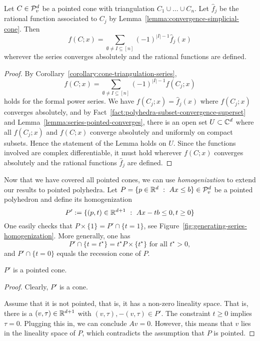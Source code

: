 \begin{lemma}
  \label{lemma:pointed-cone-rational-function}
  Let $C \in \mathcal{P}_v^d$ be a pointed cone
  with triangulation $C_1 \cup \dots \cup C_n$.
  Let $\hat f_j$ be the rational function associated to $C_j$ by Lemma~\ref{lemma:convergence-simplicial-cone}.
  Then
  \[
    f(C;x) = \sum_{\emptyset \neq I \subseteq [n]} (-1)^{|I| - 1} \hat f_j(x)
  \]
  wherever the series converges absolutely and the rational functions are defined.
\end{lemma}
\begin{proof}
  By Corollary~\ref{corollary:cone-triangulation-series},
  \[
    f(C;x) = \sum_{\emptyset \neq I \subseteq [n]} (-1)^{|I| - 1} f(C_j;x)
  \]
  holds for the formal power series.
  We have $f(C_j;x) = \hat f_j(x)$ where $f(C_j;x)$ converges absolutely,
  and by Fact~\ref{fact:polyhedra-subset-convergence-superset}
  and Lemma~\ref{lemma:series-pointed-converges},
  there is an open set $U \subset \mathbb{C}^d$ where all $f(C_j;x)$ and $f(C;x)$
  converge absolutely and uniformly on compact subsets.
  Hence the statement of the Lemma holds on $U$.
  Since the functions involved are complex differentiable,
  it must hold wherever $f(C;x)$ converges absolutely and the rational functions $\hat f_j$ are defined.
\end{proof}

Now that we have covered all pointed cones,
we can use \emph{homogenization} to extend our results to pointed polyhedra.
Let $P = \{ p \in \mathbb{R}^d ~:~ Ax \leq b \} \in \mathcal{P}_v^d$ be a pointed polyhedron and define its homogenization
\[
  P' := \{ (p,t) \in \mathbb{R}^{d+1} ~:~ Ax - tb \leq 0, t \geq 0 \}
\]
One easily checks that $P \times \{ 1 \} = P' \cap \{ t = 1\}$, see Figure~\ref{fig:generating-series-homogenization}.
More generally, one has
\[
  P' \cap \{ t = t^\star \} = t^\star P \times \{ t^\star \} \text{ for all } t^\star > 0,
\]
and $P' \cap \{ t = 0 \}$ equals the recession cone of $P$.

\begin{lemma}
  $P'$ is a pointed cone.
\end{lemma}
\begin{proof}
  Clearly, $P'$ is a cone.

  Assume that it is not pointed, that is, it has a non-zero lineality space.
  That is, there is a $(v,\tau) \in \mathbb{R}^{d + 1}$ with $(v,\tau),-(v,\tau) \in P'$.
  The constraint $t \geq 0$ implies $\tau = 0$.
  Plugging this in, we can conclude $Av = 0$.
  However, this means that $v$ lies in the lineality space of $P$,
  which contradicts the assumption that $P$ is pointed.
\end{proof}

